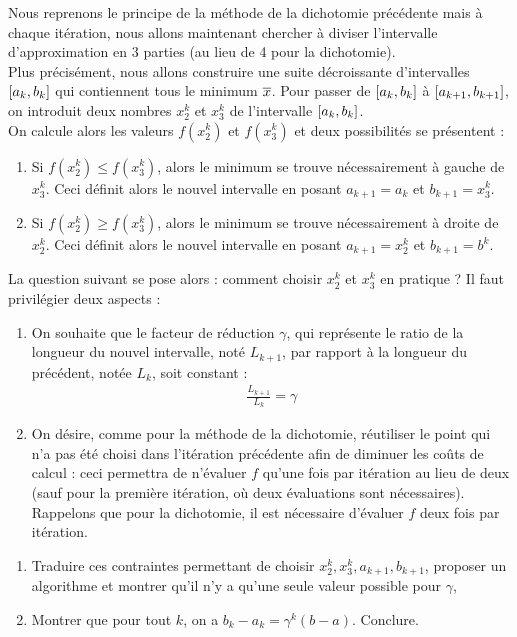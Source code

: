 \documentclass[french,a4paper,10pt]{article}
\begin{document}
	\begin{td-exo}
		Nous reprenons le principe de la méthode de la dichotomie précédente mais à chaque itération, nous allons maintenant chercher à diviser l'intervalle d'approximation en 3 parties (au lieu de 4 pour la dichotomie).\\
		
		Plus précisément, nous allons construire une suite décroissante d'intervalles $\mathopen{[}a_k,b_k\mathclose{]}$ qui contiennent tous le minimum $\overline{x}$. Pour passer de $\mathopen{[}a_k,b_k\mathclose{]}$ à $\mathopen{[}a_{k+1},b_{k+1}\mathclose{]}$, on introduit deux nombres $x_2^k$ et $x_3^k$ de l'intervalle $\mathopen{[}a_k,b_k\mathclose{]}$.\\
			
		On calcule alors les valeurs $f(x_2^k)$ et $f(x_3^k)$ et deux possibilités se présentent :
			\begin{enumerate}[label=$(\roman*)$]
				\item Si $f(x_2^k)\le f(x_3^k)$, alors le minimum se trouve nécessairement à gauche de $x_3^k$. Ceci définit alors le nouvel intervalle en posant $a_{k+1}=a_k$ et $b_{k+1}=x_3^k$.
				
				\item Si $f(x_2^k)\ge f(x_3^k)$, alors le minimum se trouve nécessairement à droite de $x_2^k$. Ceci définit alors le nouvel intervalle en posant $a_{k+1}=x_2^k$ et $b_{k+1}=b^k$.
			\end{enumerate}
		La question suivant se pose alors : comment choisir $x_2^k$ et $x_3^k$ en pratique ? Il faut privilégier deux aspects :
			\begin{enumerate}[label=$(\roman*)$]
				\item On souhaite que le facteur de réduction $\gamma$, qui représente le ratio de la longueur du nouvel intervalle, noté $L_{k+1}$, par rapport à la longueur du précédent, notée $L_k$, soit constant :
					\[\begin{aligned}
						\frac{L_{k+1}}{L_k}=\gamma
					\end{aligned}\]
				\item On désire, comme pour la méthode de la dichotomie, réutiliser le point qui n'a pas été choisi dans l'itération précédente afin de diminuer les coûts de calcul : ceci permettra de n'évaluer $f$ qu'une fois par itération au lieu de deux (sauf pour la première itération, où deux évaluations sont nécessaires). Rappelons que pour la dichotomie, il est nécessaire d'évaluer $f$ deux fois par itération.
			\end{enumerate}
		\begin{enumerate}
			\item Traduire ces contraintes permettant de choisir $x_2^k,x_3^k,a_{k+1},b_{k+1}$, proposer un algorithme et montrer qu'il n'y a qu'une seule valeur possible pour $\gamma$,
			
			\item Montrer que pour tout $k$, on a $b_k-a_k=\gamma^k(b-a)$. Conclure.
		\end{enumerate}
	\end{td-exo}
	
\end{document}
